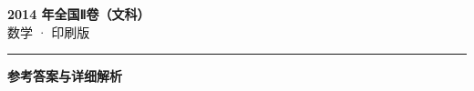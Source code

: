 \documentclass[zihao=5, a4paper]{ctexart}
\begin{document}
\begin{center}
  {\Large\bfseries 2014 年全国Ⅱ卷（文科）}\\[4pt]
  {\large 数学 · 印刷版}
\end{center}
\medskip
{}

\par\bigskip\hrule\bigskip
{}
\begin{center}{\large\bfseries 参考答案与详细解析}\end{center}
\smallskip

\end{document}
